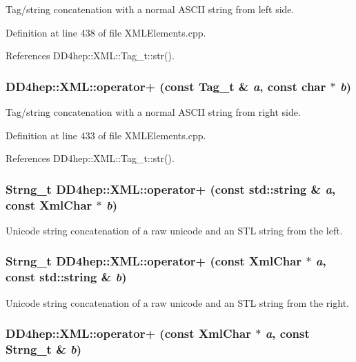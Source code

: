 Tag/string concatenation with a normal ASCII string from left side. 

Definition at line 438 of file XMLElements.cpp.

References DD4hep::XML::Tag\_\-t::str().\hypertarget{group___d_d4_h_e_p___x_m_l_gacf5fdc46e1dad4d2935283ead3a4c0fd}{
\subsubsection[{operator+}]{ DD4hep::XML::operator+ (const {\bf Tag\_\-t} \& {\em a}, \/  const char $\ast$ {\em b})}}
\label{group___d_d4_h_e_p___x_m_l_gacf5fdc46e1dad4d2935283ead3a4c0fd}


Tag/string concatenation with a normal ASCII string from right side. 

Definition at line 433 of file XMLElements.cpp.

References DD4hep::XML::Tag\_\-t::str().\hypertarget{group___d_d4_h_e_p___x_m_l_ga2158e654f7603cf773042a5cb231f398}{
\subsubsection[{operator+}]{\setlength{\rightskip}{0pt plus 5cm}Strng\_\-t DD4hep::XML::operator+ (const std::string \& {\em a}, \/  const XmlChar $\ast$ {\em b})}}
\label{group___d_d4_h_e_p___x_m_l_ga2158e654f7603cf773042a5cb231f398}


Unicode string concatenation of a raw unicode and an STL string from the left. \hypertarget{group___d_d4_h_e_p___x_m_l_ga818876f0e3a3be20c11eeb6ea2871bdc}{
\subsubsection[{operator+}]{\setlength{\rightskip}{0pt plus 5cm}Strng\_\-t DD4hep::XML::operator+ (const XmlChar $\ast$ {\em a}, \/  const std::string \& {\em b})}}
\label{group___d_d4_h_e_p___x_m_l_ga818876f0e3a3be20c11eeb6ea2871bdc}


Unicode string concatenation of a raw unicode and an STL string from the right. \hypertarget{group___d_d4_h_e_p___x_m_l_gafe9f9443003bbab38d67856960e62071}{
\subsubsection[{operator+}]{ DD4hep::XML::operator+ (const XmlChar $\ast$ {\em a}, \/  const {\bf Strng\_\-t} \& {\em b})}}
\label{group___d_d4_h_e_p___x_m_l_gafe9f9443003bbab38d67856960e62071}


